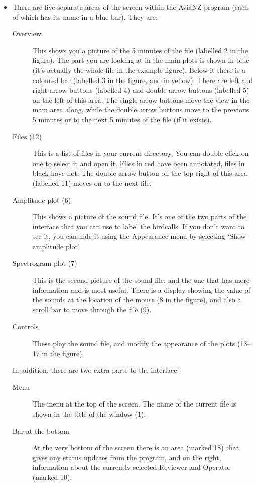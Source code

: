 \documentclass{article}
\begin{document}
\newpage
\begin{itemize}
\item There are five separate areas of the screen within the AviaNZ program (each of which has its name in a blue bar). They are:
	\begin{description}
	\item[Overview] This shows you a picture of the 5 minutes of the file (labelled 2 in the figure). The part you are looking at in the main plots is shown in blue (it's actually the whole file in the example figure). Below it there is a coloured bar (labelled 3 in the figure, and in yellow). There are left and right arrow buttons (labelled 4) and double arrow buttons (labelled 5) on the left of this area. The single arrow buttons move the view in the main area along, while the double arrow buttons move to the previous 5 minutes or to the next 5 minutes of the file (if it exists). 
	\item [Files (12)] This is a list of files in your current directory. You can double-click on one to select it and open it. Files in red have been annotated, files in black have not. The double arrow button on the top right of this area (labelled 11) moves on to the next file.
	\item[Amplitude plot (6)] This shows a picture of the sound file. It's one of the two parts of the interface that you can use to label the birdcalls. If you don't want to see it, you can hide it using the Appearance menu by selecting `Show amplitude plot'
	\item[Spectrogram plot (7)] This is the second picture of the sound file, and the one that has more information and is most useful. There is a display showing the value of the sounds at the location of the mouse (8 in the figure), and also a scroll bar to move through the file (9). 
	\item[Controls] These play the sound file, and modify the appearance of the plots (13--17 in the figure).
	\end{description}

In addition, there are two extra parts to the interface:
	\begin{description}
	\item[Menu] The menu at the top of the screen. The name of the current file is shown in the title of the window (1).
	\item[Bar at the bottom] At the very bottom of the screen there is an area (marked 18) that gives any status updates from the program, and on the right, information about the currently selected Reviewer and Operator (marked 10).
	\end{description}


\end{itemize}
\end{document}
